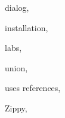 
\begin{theindex}

  
  \item dialog, 

  \indexspace

  \item installation, 

  \indexspace

  \item labs, 

  \indexspace

  \item union, 
  \item uses
    \subitem references, 

  \indexspace

  \item Zippy, 

\end{theindex}
